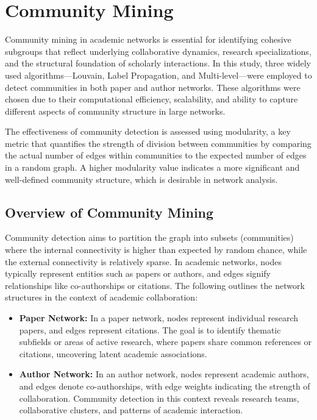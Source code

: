 \documentclass[11pt]{article}
\begin{document}
\section{Community Mining}

Community mining in academic networks is essential for identifying cohesive subgroups that reflect underlying collaborative dynamics, research specializations, and the structural foundation of scholarly interactions. In this study, three widely used algorithms—Louvain, Label Propagation, and Multi-level—were employed to detect communities in both paper and author networks. These algorithms were chosen due to their computational efficiency, scalability, and ability to capture different aspects of community structure in large networks.

The effectiveness of community detection is assessed using modularity, a key metric that quantifies the strength of division between communities by comparing the actual number of edges within communities to the expected number of edges in a random graph. A higher modularity value indicates a more significant and well-defined community structure, which is desirable in network analysis.

\subsection{Overview of Community Mining}

Community detection aims to partition the graph into subsets (communities) where the internal connectivity is higher than expected by random chance, while the external connectivity is relatively sparse. In academic networks, nodes typically represent entities such as papers or authors, and edges signify relationships like co-authorships or citations. The following outlines the network structures in the context of academic collaboration:

\begin{itemize}
    \item \textbf{Paper Network:} In a paper network, nodes represent individual research papers, and edges represent citations. The goal is to identify thematic subfields or areas of active research, where papers share common references or citations, uncovering latent academic associations.
    \item \textbf{Author Network:} In an author network, nodes represent academic authors, and edges denote co-authorships, with edge weights indicating the strength of collaboration. Community detection in this context reveals research teams, collaborative clusters, and patterns of academic interaction.
\end{itemize}
\end{document}
